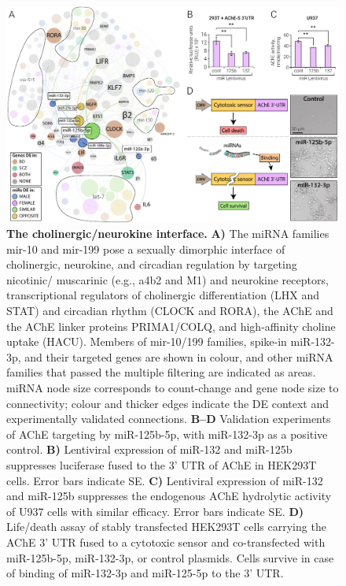 \begin{figure}[ht]
\includegraphics[width=\textwidth]{figures/smallnet}
\caption[The cholinergic/neurokine interface.]{\textbf{The cholinergic/neurokine interface.} \textbf{A)} The miRNA families mir-10 and mir-199 pose a sexually dimorphic interface of cholinergic, neurokine, and circadian regulation by targeting nicotinic/ muscarinic (e.g., a4b2 and M1) and neurokine receptors, transcriptional regulators of cholinergic differentiation (LHX and STAT) and circadian rhythm (CLOCK and RORA), the AChE and the AChE linker proteins PRIMA1/COLQ, and high-affinity choline uptake (HACU). Members of mir-10/199 families, spike-in miR-132-3p, and their targeted genes are shown in colour, and other miRNA families that passed the multiple filtering are indicated as areas. miRNA node size corresponds to count-change and gene node size to connectivity; colour and thicker edges indicate the DE context and experimentally validated connections. \textbf{B–D} Validation experiments of AChE targeting by miR-125b-5p, with miR-132-3p as a positive control. \textbf{B)} Lentiviral expression of miR-132 and miR-125b suppresses luciferase fused to the 3' UTR of AChE in HEK293T cells. Error bars indicate SE. \textbf{C)} Lentiviral expression of miR-132 and miR-125b suppresses the endogenous AChE hydrolytic activity of U937 cells with similar efficacy. Error bars indicate SE. \textbf{D)} Life/death assay of stably transfected HEK293T cells carrying the AChE 3' UTR fused to a cytotoxic sensor and co-transfected with miR-125b-5p, miR-132-3p, or control plasmids. Cells survive in case of binding of miR-132-3p and miR-125-5p to the 3' UTR.
\label{fig:smallnet}}
\end{figure}

